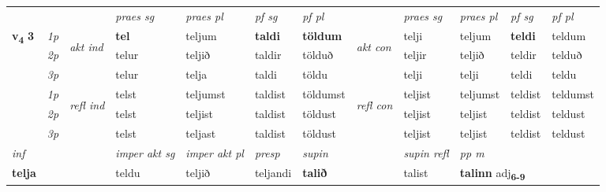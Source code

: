 \begin{longtable}[l]{X>{\footnotesize\itshape}llXXXXlXXXX}
 & &   & \textit{praes sg}  & \textit{praes pl}    & \textit{ pf sg} & \textit{pf pl} & & \textit{praes sg}  & \textit{praes pl}    & \textit{pf sg} & \textit{pf pl }  \\ \cmidrule{4-7} \cmidrule{9-12}
 \multirow{2}{*}{{{\textbf{v{\textsubscript{4}}} \Large{\textbf{3}}}}}  & 1p & \multirow{3}{*}{\begin{turn}{90}\textit{akt ind}\end{turn}} & \textbf{tel} & teljum & \textbf{taldi} & \textbf{töldum} & \multirow{3}{*}{\begin{turn}{90}\textit{akt con}\end{turn}} &telji & teljum & \textbf{teldi} & teldum\\*
 & 2p &  &  telur  & teljið & taldir & tölduð & & teljir & teljið & teldir & telduð \\*
 & 3p &  & telur & telja & taldi & töldu & & telji & telji& teldi & teldu \\*
\cmidrule{4-7} \cmidrule{9-12}
 & 1p & \multirow{3}{*}{\begin{turn}{90}\textit{refl ind}\end{turn}}  & telst & teljumst & taldist & töldumst & \multirow{3}{*}{\begin{turn}{90}\textit{refl con}\end{turn}}  &teljist & teljumst & teldist & teldumst \\*
 & 2p &  & telst & teljist & taldist & töldust & &teljist & teljist & teldist & teldust \\*
 & 3p  & & telst & teljast & taldist & töldust & & teljist & teljist& teldist & teldust \\*
\cmidrule{4-7} \cmidrule{9-12}

   {\textit{inf}} & &  & \textit{imper akt sg} & \textit{imper akt pl}   & \textit{presp} & \textit{supin} && \textit{supin refl} & \textit{pp m} \\*
  {\textbf{telja}} & && teldu  & teljið   & teljandi &  \textbf{talið} && talist & \multicolumn{2}{l}{\textbf{talinn} adj\textbf{\textsubscript{6-9}}} \\*

\midrule


\end{longtable}
